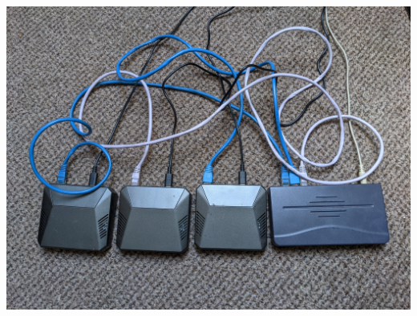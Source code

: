 \documentclass[25pt, a0paper, portrait]{tikzposter}
\begin{document}
\begin{columns}
    {
        \includegraphics[width=\linewidth]{testbed.jpg}\\
        \\
    }


\end{columns}
\end{document}
